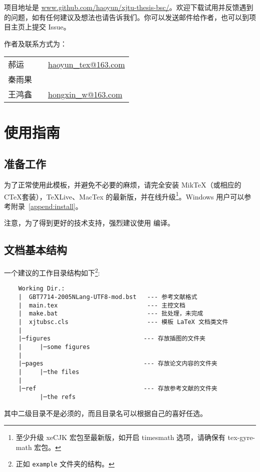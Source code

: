 \documentclass[%
               amsthm,
              ]{xjtubsc}
\begin{document}
项目地址是 \url{www.github.com/haoyun/xjtu-thesis-bsc/}。欢迎下载试用并反馈遇到的问题，如有任何建议及想法也请告诉我们。你可以发送邮件给作者，也可以到项目主页上提交 Issue。

作者及联系方式为：
\begin{center}
\begin{tabular}{lp{1em}l}
郝运&&\href{maito:haoyun_tex@163.com}{haoyun\_tex@163.com}\\ 秦雨果&&\\
王鸿鑫&&\href{maito:hongxin_w@163.com}{hongxin\_w@163.com}
\end{tabular}
\end{center}

\section{使用指南}
\subsection{准备工作}

%
%

为了正常使用此模板，并避免不必要的麻烦，请完全安装 MikTeX（或相应的 C\TeX 套装），TeXLive、MacTex 的最新版，并在线升级\footnote{至少升级 xeCJK 宏包至最新版，如开启 timesmath 选项，请确保有 tex-gyre-math 宏包。}。Windows 用户可以参考附录~\ref{append:install}。

{\color{red}注意}，为了得到更好的技术支持，强烈建议使用  编译。

\subsection{文档基本结构}
一个建议的工作目录结构如下\footnote{正如 \verb|example| 文件夹的结构。}:
\begin{verbatim}
    Working Dir.:
    |  GBT7714-2005NLang-UTF8-mod.bst   --- 参考文献格式
    |  main.tex                         --- 主控文档
    |  make.bat                         --- 批处理，未完成
    |  xjtubsc.cls                      --- 模板 LaTeX 文档类文件
    |
    |─figures                          --- 存放插图的文件夹
    |     |─some figures
    |
    |─pages                            --- 存放论文内容的文件夹
    |     |─the files
    |
    |─ref                              --- 存放参考文献的文件夹
          |─the refs
\end{verbatim}
其中二级目录不是必须的，而且目录名可以根据自己的喜好任选。
\end{document}
